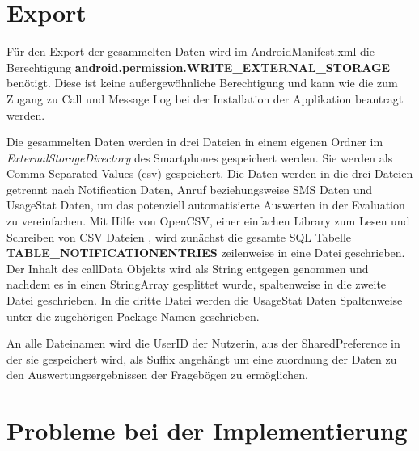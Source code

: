 \section{Export}

Für den Export der gesammelten Daten wird im AndroidManifest.xml die Berechtigung \textbf{android.permission.WRITE\_EXTERNAL\_STORAGE}
benötigt. 
Diese ist keine außergewöhnliche Berechtigung und kann wie die zum Zugang zu Call und Message Log bei der Installation der Applikation beantragt werden.
\par
Die gesammelten Daten werden in drei Dateien in einem eigenen Ordner im \emph{ExternalStorageDirectory} des Smartphones gespeichert werden.
Sie werden als Comma Separated Values (csv) gespeichert.
Die Daten werden in die drei Dateien getrennt nach Notification Daten, Anruf beziehungsweise SMS Daten und UsageStat Daten, um das potenziell automatisierte Auswerten in der Evaluation zu vereinfachen.
Mit Hilfe von OpenCSV, einer einfachen Library zum Lesen und Schreiben von CSV Dateien \cite{opencsv},
wird zunächst die gesamte SQL Tabelle \textbf{TABLE\_NOTIFICATIONENTRIES} zeilenweise in eine Datei geschrieben.
Der Inhalt des callData Objekts wird als String entgegen genommen und nachdem es in einen StringArray gesplittet wurde, spaltenweise in die zweite Datei geschrieben.
In die dritte Datei werden die UsageStat Daten Spaltenweise unter die zugehörigen Package Namen geschrieben.
\par
An alle Dateinamen wird die UserID der Nutzerin, aus der SharedPreference in der sie gespeichert wird, als Suffix angehängt um eine zuordnung der Daten zu den Auswertungsergebnissen der Fragebögen zu ermöglichen.

\section{Probleme bei der Implementierung}
